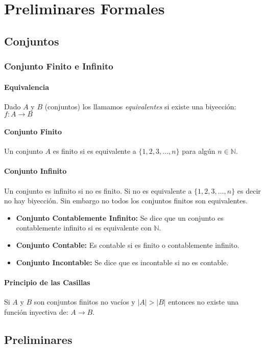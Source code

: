 \chapter{Preliminares Formales}
\section{Conjuntos}
\subsection{Conjunto Finito e Infinito}
\subsubsection{Equivalencia} Dado $A$ y $B$ (conjuntos) los llamamos \textit{equivalentes} si existe una biyección: $f:A\rightarrow B$
\subsubsection{Conjunto Finito}
Un conjunto $A$ es finito si es equivalente a $\{1,2,3,\ldots ,n\}$ para algún $n\in\mathbb{N}$.
\subsubsection{Conjunto Infinito}
Un conjunto es infinito si no es finito. Si no es equivalente a $\{1,2,3,\ldots , n\}$ es decir no hay biyección. Sin embargo no todos los conjuntos finitos son equivalentes.
\begin{itemize}
\item \textbf{Conjunto Contablemente Infinito:}  Se dice que un conjunto es contablemente infinito si es equivalente con $\mathbb{N}$.
\item \textbf{Conjunto Contable:} Es contable si es finito o contablemente infinito.
\item \textbf{Conjunto Incontable:} Se dice que es incontable si no es contable.  
\end{itemize}

\subsubsection{Principio de las Casillas}
Si $A$ y $B$ son conjuntos finitos no vacíos y $|A|>|B|$ entonces no existe una función inyectiva de: $A\rightarrow B$.
\section{Preliminares}
